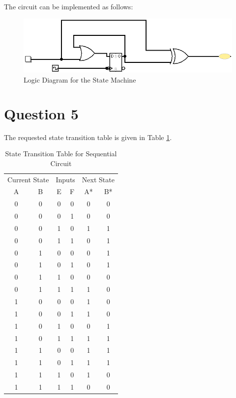\documentclass[table ]{article}
\begin{document}
The circuit can be implemented as follows:

\begin{figure}[H]
    \centering
    \includegraphics[width=\textwidth]{diagram2.png}     
    \caption{Logic Diagram for the State Machine}
\end{figure}

\newpage

\section*{Question 5}

The requested state transition table is given in Table \ref{tab:state_transition}.

\begin{table}[H]
    \caption{State Transition Table for Sequential Circuit}
    \begin{center}
    \begin{tabular}{cccc|cc}
    \hline
    \multicolumn{2}{c}{Current State} & \multicolumn{2}{c|}{Inputs} & \multicolumn{2}{c}{Next State} \\
    A & B & E & F & A* & B* \\
    \hline
    0 & 0 & 0 & 0 & 0 & 0 \\
    0 & 0 & 0 & 1 & 0 & 0 \\
    0 & 0 & 1 & 0 & 1 & 1 \\
    0 & 0 & 1 & 1 & 0 & 1 \\
    \hline
    
    0 & 1 & 0 & 0 & 0 & 1 \\
    0 & 1 & 0 & 1 & 0 & 1 \\
    
    0 & 1 & 1 & 0 & 0 & 0 \\
    0 & 1 & 1 & 1 & 1 & 0 \\
    \hline
    
    1 & 0 & 0 & 0 & 1 & 0 \\
    1 & 0 & 0 & 1 & 1 & 0 \\
    
    1 & 0 & 1 & 0 & 0 & 1 \\
    1 & 0 & 1 & 1 & 1 & 1 \\
    \hline
    
    1 & 1 & 0 & 0 & 1 & 1 \\
    1 & 1 & 0 & 1 & 1 & 1 \\
    
    1 & 1 & 1 & 0 & 1 & 0 \\
    1 & 1 & 1 & 1 & 0 & 0 \\
    \hline
    \end{tabular}
    \end{center}
    \label{tab:state_transition}
    \end{table}
\end{document}
